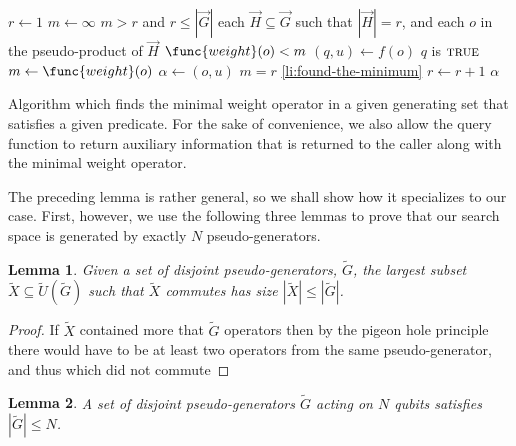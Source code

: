 \documentclass[twocolumn,showpacs,preprintnumbers,amsmath,amssymb,nofootinbib,pra,floatfix]{revtex4-1}
\newtheorem{lemma}{Lemma}
\newenvironment{remark}[1][Remark]{\begin{trivlist}
\item[\hskip \labelsep {\bfseries #1}]}{\end{trivlist}}
\newcommand{\lst}{\vec}
\newcommand{\set}{\tilde}
\begin{document}
\begin{table}
\begin{codebox}
\Procname{$\proc{Find-Weight-Minimizer}(f,\lst G)$}
\li $r \gets 1$
\li $m \gets \infty$
\li \While $m > r$ and $r \le |\lst G|$
\li \Do
\li     \For each $\lst H\subseteq \lst G$ such that $|\lst H|=r$,
\li     and each $o$ in the pseudo-product of $\lst H$
\li     \Do
\li         \If $\func{weight}(o) < m$
\li         \Then
\li             $(q,u) \gets f(o)$
\li             \If $q$ is $\textsc{true}$
\li             \Then
\li                 $m \gets \func{weight}(o)$
\li                 $\alpha \gets (o,u)$
\li                 \If $m = r$
\li                 \Then
\li                     \Goto \ref{li:found-the-minimum}
                    \End
                \End
            \End
        \End
\li     $r \gets r + 1$
    \End
\li \Return $\alpha$ \label{li:found-the-minimum}
\end{codebox}
\caption[Algorithm ]{Algorithm which finds the minimal weight operator in a given generating set that satisfies a given predicate.  For the sake of convenience, we also allow the query function to return auxiliary information that is returned to the caller along with the minimal weight operator.} \label{table:find-weight-minimizer}
\end{table}
\begin{remark}
The preceding lemma is rather general, so we shall show how it specializes to our case.  First, however, we use the following three lemmas to prove that our search space is generated by exactly $N$ pseudo-generators.
\end{remark}

\begin{lemma}
\label{lemma:lower bound on number of disjoint pseudo-generators}
Given a set of disjoint pseudo-generators, $\set G$, the largest subset $\set X\subseteq\set U(\set G)$ such that $\set X$ commutes has size $|\set X|\le|\set G|$.
\end{lemma}

\begin{proof}
If $\set X$ contained more that $\set G$ operators then by the pigeon hole principle there would have to be at least two operators from the same pseudo-generator, and thus which did not commute
\end{proof}

\begin{lemma}
\label{lemma:upper bound on number of disjoint pseudo-generators}
A set of disjoint pseudo-generators $\set G$ acting on $N$ qubits satisfies $|\set G|\le N$.
\end{lemma}
\end{document}
